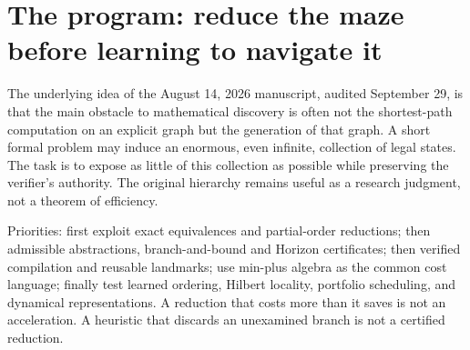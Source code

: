 \documentclass[11pt]{article}
\theoremstyle{definition}\newtheorem{definition}[theorem]{Definition}\newtheorem{example}[theorem]{Example}\newtheorem{conjecture}[theorem]{Conjecture}
\begin{document}
\section{The program: reduce the maze before learning to navigate it}
The underlying idea of the August 14, 2026 manuscript, audited September 29, is that the main obstacle to mathematical discovery is often not the shortest-path computation on an explicit graph but the generation of that graph. A short formal problem may induce an enormous, even infinite, collection of legal states. The task is to expose as little of this collection as possible while preserving the verifier's authority. The original hierarchy remains useful as a research judgment, not a theorem of efficiency.
\begin{center}
\end{center}
Priorities: first exploit exact equivalences and partial-order reductions; then admissible abstractions, branch-and-bound and Horizon certificates; then verified compilation and reusable landmarks; use min-plus algebra as the common cost language; finally test learned ordering, Hilbert locality, portfolio scheduling, and dynamical representations. A reduction that costs more than it saves is not an acceleration. A heuristic that discards an unexamined branch is not a certified reduction.
\end{document}
